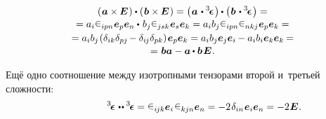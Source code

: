 \begin{otherlanguage}{russian}
\vspace{-0.45em}\begin{multline}\label{vectorcrossidentitydotvectorcrossidentity}
\left(\hspace{0.1ex} \bm{a} \times\hspace{-0.1ex} \bm{E} \hspace{0.16ex}\right) \dotp \left(\hspace{0.12ex} \bm{b} \times\hspace{-0.1ex} \bm{E} \hspace{0.16ex}\right) =
\left(\hspace{0.1ex} \bm{a} \hspace{0.2ex} \dotp \levicivitatensor \hspace{0.16ex}\right) \hspace{-0.12ex}\dotp \left(\hspace{0.1ex} \bm{b} \hspace{0.2ex} \dotp \levicivitatensor \hspace{0.16ex}\right) = \\[-0.2em]
%
= a_i \levicivita_{ipn} \hspace{0.1ex} \bm{e}_p \bm{e}_n \dotp \hspace{0.2ex} b_j \levicivita_{jsk} \hspace{0.1ex} \bm{e}_s \bm{e}_k
= a_i b_j \levicivita_{ipn} \levicivita_{nkj} \hspace{0.05ex} \bm{e}_p \bm{e}_k = \\[-0.08em]
%
= a_i b_j \hspace{-0.2ex} \left( \delta_{ik} \delta_{pj} \hspace{-0.2ex} - \delta_{i\hspace{-0.1ex}j} \delta_{pk} \right) \hspace{-0.2ex} \bm{e}_p \bm{e}_k
= a_i b_j \bm{e}_j \bm{e}_i \hspace{-0.12ex} - a_i b_i \bm{e}_k \bm{e}_k \hspace{-0.16ex} = \\[-0.18em]
%
= \hspace{0.1ex} \bm{b} \bm{a} - \bm{a} \hspace{-0.1ex} \dotp \bm{b} \hspace{0.2ex} \bm{E} \hspace{0.1ex}.
\end{multline}

\vspace{-0.2em} Ещё одно соотношение между изотропными тензорами второй и~третьей сложности:
\begin{equation}
\hspace{4.4em} \levicivitatensor \hspace{0.2ex} \dotdotp \levicivitatensor = \levicivita_{i\hspace{-0.1ex}jk} \bm{e}_i \hspace{0.2ex} \levicivita_{kjn} \bm{e}_n = - 2 \hspace{.2ex} \delta_{in} \hspace{.12ex} \bm{e}_i \bm{e}_n = - 2 \hspace{0.1ex} \bm{E} \hspace{0.1ex}.
\end{equation}


\end{otherlanguage}
